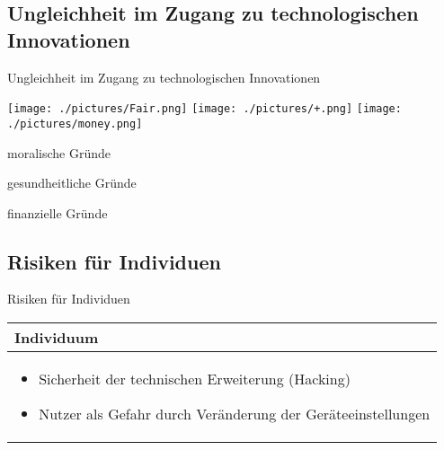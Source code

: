 \documentclass[aspectratio=169,16pt,xcolor=table]{beamer}
\begin{document}
\subsection{Ungleichheit im Zugang zu technologischen Innovationen}
\begin{frame}{Ungleichheit im Zugang zu technologischen Innovationen}
    \centering
    
    \texttt{[image: ./pictures/Fair.png]}
    \hspace{1.8cm}
    \texttt{[image: ./pictures/+.png]}
    \hspace{1.8cm}
    \texttt{[image: ./pictures/money.png]}
    
    \vspace{0.2cm}
    
    \begin{minipage}[t]{0.2\textwidth}
      \centering
      \begin{center}
        \small moralische Gründe
      \end{center}
    \end{minipage}
     \hspace{1.2cm}
    \begin{minipage}[t]{0.2\textwidth}
    \centering
    \small gesundheitliche Gründe
    \end{minipage}
    \hspace{1,8cm}
    \begin{minipage}[t]{0.2\textwidth}
    \centering
    \small finanzielle Gründe
    \end{minipage}
\end{frame}

\subsection{Risiken für Individuen}
\begin{frame}{Risiken für Individuen}
\centering
\renewcommand{\arraystretch}{1.5} %
\begin{tabular}{|p{12cm}|}
    \hline
    \rowcolor{blue!25}
    \textbf{Individuum}\\
    \hline
    \begin{itemize}
        \item Sicherheit der technischen Erweiterung (Hacking)
        \item Nutzer als Gefahr durch Veränderung der Geräteeinstellungen
    \end{itemize} \\
    \hline
\end{tabular}
\end{frame}
\end{document}
